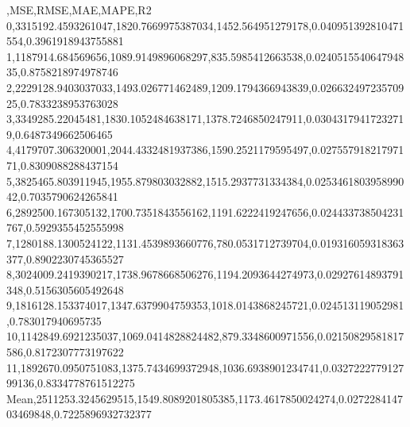 ,MSE,RMSE,MAE,MAPE,R2
0,3315192.4593261047,1820.7669975387034,1452.564951279178,0.040951392810471554,0.3961918943755881
1,1187914.684569656,1089.9149896068297,835.5985412663538,0.024051554064794835,0.8758218974978746
2,2229128.9403037033,1493.026771462489,1209.1794366943839,0.02663249723570925,0.7833238953763028
3,3349285.22045481,1830.1052484638171,1378.7246850247911,0.03043179417232719,0.6487349662506465
4,4179707.306320001,2044.4332481937386,1590.2521179595497,0.02755791821797171,0.8309088288437154
5,3825465.803911945,1955.879803032882,1515.2937731334384,0.025346180395899042,0.7035790624265841
6,2892500.167305132,1700.7351843556162,1191.6222419247656,0.024433738504231767,0.5929355452555998
7,1280188.1300524122,1131.4539893660776,780.0531712739704,0.019316059318363377,0.8902230745365527
8,3024009.2419390217,1738.9678668506276,1194.2093644274973,0.02927614893791348,0.5156305605492648
9,1816128.153374017,1347.6379904759353,1018.0143868245721,0.024513119052981,0.783017940695735
10,1142849.6921235037,1069.0414828824482,879.3348600971556,0.02150829581817586,0.8172307773197622
11,1892670.0950751083,1375.7434699372948,1036.6938901234741,0.032722277912799136,0.8334778761512275
Mean,2511253.3245629515,1549.8089201805385,1173.4617850024274,0.027228414703469848,0.7225896932732377
